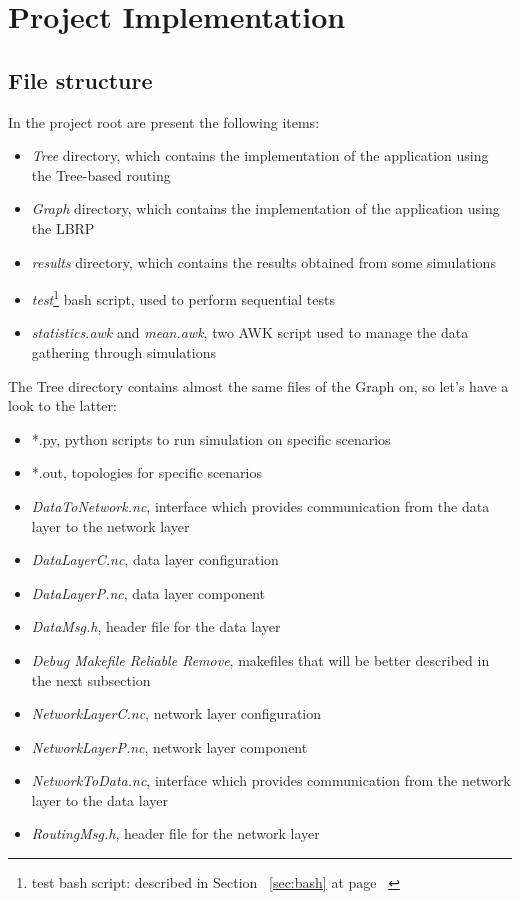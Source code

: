 \documentclass{article}
\begin{document}

\section{Project Implementation}
	\subsection{File structure}
	In the project root are present the following items:
	\begin{itemize}
		\item \emph{Tree} directory, which contains the implementation of the application using the Tree-based routing
		\item \emph{Graph} directory, which contains the implementation of the application using the LBRP
		\item \emph{results} directory, which contains the results obtained from some simulations
		\item \emph{test}\footnote{test bash script: described in Section ~\ref{sec:bash} at page ~\pageref{sec:bash}} bash script, used to perform sequential tests
		\item \emph{statistics.awk} and \emph{mean.awk}, two AWK script used to manage the data gathering through simulations
	\end{itemize}
	The Tree directory contains almost the same files of the Graph on, so let's have a look to the latter:
	\begin{itemize}
		\item *.py, python scripts to run simulation on specific scenarios
		\item *.out, topologies for specific scenarios
		\item \emph{DataToNetwork.nc}, interface which provides communication from the data layer to the network layer
		\item \emph{DataLayerC.nc}, data layer configuration
		\item \emph{DataLayerP.nc}, data layer component
		\item \emph{DataMsg.h}, header file for the data layer
		\item \emph{Debug Makefile Reliable Remove}, makefiles that will be better described in the next subsection
		\item \emph{NetworkLayerC.nc}, network layer configuration
		\item \emph{NetworkLayerP.nc}, network layer component
		\item \emph{NetworkToData.nc}, interface which provides communication from the network layer to the data layer
		\item \emph{RoutingMsg.h}, header file for the network layer
	\end{itemize}
\end{document}
